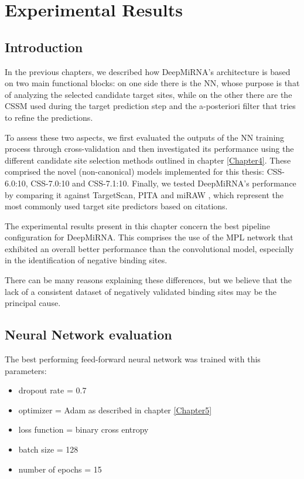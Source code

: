 
\chapter{Experimental Results} %

\label{Chapter6} %

\section{Introduction}
In the previous chapters, we described how DeepMiRNA's architecture is based on two main functional blocks: on one side there is the NN, whose purpose is that of analyzing the selected candidate target sites, while on the other there are the CSSM used during the target prediction step and the a-posteriori filter that tries to refine the predictions. 

To assess these two aspects, we first evaluated the outputs of the NN training process through cross-validation and then investigated its performance using the different candidate site selection methods outlined in chapter \ref{Chapter4}. These comprised the novel (non-canonical) models implemented for this thesis: CSS-6.0:10, CSS-7.0:10 and CSS-7.1:10. Finally, we tested DeepMiRNA’s performance by comparing it against TargetScan\cite{targetscan}, PITA\cite{accessibility_nrg_role} and miRAW \cite{miraw}, which represent the most commonly used target site predictors based on citations.

The experimental results present in this chapter concern the best pipeline configuration for DeepMiRNA. This comprises the use of the MPL network that exhibited an overall better performance than the convolutional model, especially in the identification of negative binding sites. 

There can be many reasons explaining these differences, but we believe that the lack of a consistent dataset of negatively validated binding sites may be the principal cause. 

\section{Neural Network evaluation}
The best performing feed-forward neural network was trained with this parameters:

\begin{itemize}
	\item dropout rate = 0.7
	\item optimizer = Adam as described in chapter \ref{Chapter5}
	\item loss function = binary cross entropy
	\item batch size = 128
	\item number of epochs = 15
\end{itemize}

